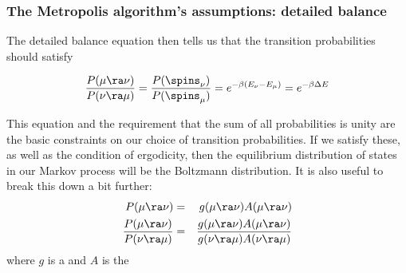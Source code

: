 \documentclass[hyperref={colorlinks=true}]{beamer}
\begin{document}
\begin{frame}%
  \frametitle{The Metropolis algorithm's assumptions: detailed balance}
  
  The detailed balance equation then tells us that the transition probabilities should satisfy
  
  \begin{equation}
    \frac{P(\mu \ra \nu)}{P(\nu \ra \mu)} = \frac{P(\spins_{\nu})}{P(\spins_{\mu})} = e^{- \beta (E_{\nu} - E_{\mu})} = e^{- \beta \Delta E}
  \end{equation}
  
  This equation and the requirement that the sum of all probabilities is unity are the basic constraints on our choice of transition probabilities. If we satisfy these, as well as the condition of ergodicity, then the equilibrium distribution of states in our Markov process will be the Boltzmann distribution. It is also useful to break this down a bit further:
  \begin{eqnarray}
    P(\mu \ra \nu) &=& g(\mu \ra \nu) A(\mu \ra \nu) \\
    \frac{P(\mu \ra \nu)}{P(\nu \ra \mu)} &=& \frac{g(\mu \ra \nu) A(\mu \ra \nu)}{g(\nu \ra \mu) A(\nu \ra \mu)}
  \end{eqnarray}
  where $g$ is a  and $A$ is the 
\end{frame}

\end{document}
